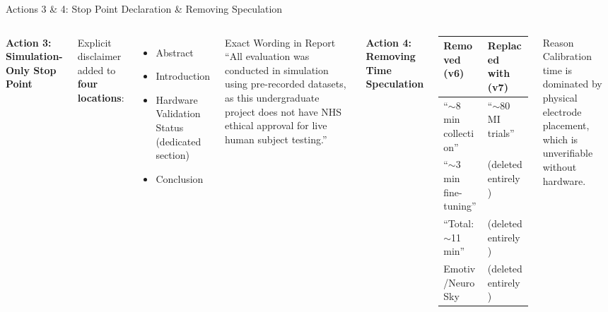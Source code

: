\documentclass[aspectratio=169, 11pt]{beamer}
\begin{document}
\begin{frame}{Actions 3 \& 4: Stop Point Declaration \& Removing Speculation}

    \begin{columns}[T]
        \textbf{Action 3: Simulation-Only Stop Point}

        Explicit disclaimer added to \textbf{four locations}:
        \begin{itemize}
            \footnotesize
            \item Abstract
            \item Introduction
            \item Hardware Validation Status (dedicated section)
            \item Conclusion
        \end{itemize}

        \begin{alertblock}{Exact Wording in Report}
            \scriptsize``All evaluation was conducted in simulation using pre-recorded datasets, as this undergraduate project does not have NHS ethical approval for live human subject testing.''
        \end{alertblock}

        \textbf{Action 4: Removing Time Speculation}

        \begin{table}
            \centering
            \footnotesize
            \begin{tabular}{p{2.5cm}p{2.5cm}}
                \toprule
                \textbf{Removed (v6)} & \textbf{Replaced with (v7)} \\
                \midrule
                ``$\sim$8 min collection'' & ``$\sim$80 MI trials'' \\
                ``$\sim$3 min fine-tuning'' & (deleted entirely) \\
                ``Total: $\sim$11 min'' & (deleted entirely) \\
                Emotiv/NeuroSky  & (deleted entirely) \\
                \bottomrule
            \end{tabular}
        \end{table}

        \begin{exampleblock}{Reason}
            \scriptsize Calibration time is dominated by physical electrode placement, which is unverifiable without hardware.
        \end{exampleblock}
    \end{columns}
\end{frame}
\end{document}
